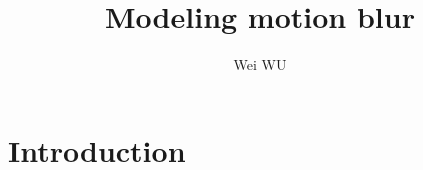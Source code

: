 \documentclass{article}
\title{Modeling motion blur}
\author{Wei WU}
\begin{document}
 
\maketitle{}

\section{Introduction}
\end{document}
